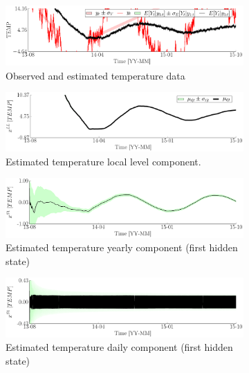 \begin{figure}[h!]
\ContinuedFloat
\begin{subfigure}{\linewidth}
\includegraphics[width=0.9\linewidth]{./docfigs/Example_DISPTEMPSIM/default/TEMP_ObservedPredicted.pdf} 
\caption{Observed and estimated temperature data}
\end{subfigure}
\begin{subfigure}{\linewidth}
\includegraphics[width=0.9\linewidth]{./docfigs/Example_DISPTEMPSIM/default/TEMP_LL_1.pdf} 
\caption{Estimated temperature local level component.}
\end{subfigure}
\begin{subfigure}{\linewidth}
\includegraphics[width=0.9\linewidth]{./docfigs/Example_DISPTEMPSIM/default/TEMP_S1_2.pdf} 
\caption{Estimated temperature yearly component (first hidden state)}
\end{subfigure}
\begin{subfigure}{\linewidth}
\includegraphics[width=0.9\linewidth]{./docfigs/Example_DISPTEMPSIM/default/TEMP_S1_4.pdf} 
\caption{Estimated temperature daily component (first hidden state)}
\end{subfigure}
\begin{subfigure}{\linewidth}

\end{subfigure}
\end{figure}
